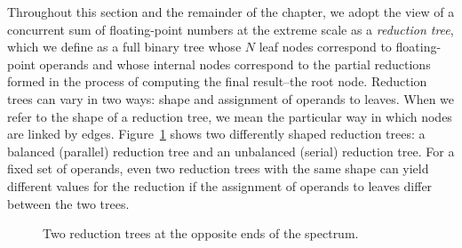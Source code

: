Throughout this section and the remainder of the chapter, we adopt the
view of a concurrent sum of floating-point numbers at the extreme
scale as a \emph{reduction tree}, which we define as a full binary
tree whose $N$ leaf nodes correspond to floating-point operands and
whose internal nodes correspond to the partial reductions formed in
the process of computing the final result--the root node.  Reduction
trees can vary in two ways: shape and assignment of operands to
leaves. When we refer to the shape of a reduction tree, we mean the
particular way in which nodes are linked by
edges. Figure~\ref{fig:redtree_diffshape} shows two differently shaped
reduction trees: a balanced (parallel) reduction tree and an
unbalanced (serial) reduction tree. For a fixed set of operands, even
two reduction trees with the same shape can yield different values for
the reduction if the assignment of operands to leaves differ between
the two trees.
\begin{figure}[!htb]
\centering
\caption{Two reduction trees at the opposite ends of the spectrum.}
\label{fig:redtree_diffshape}
\end{figure}

